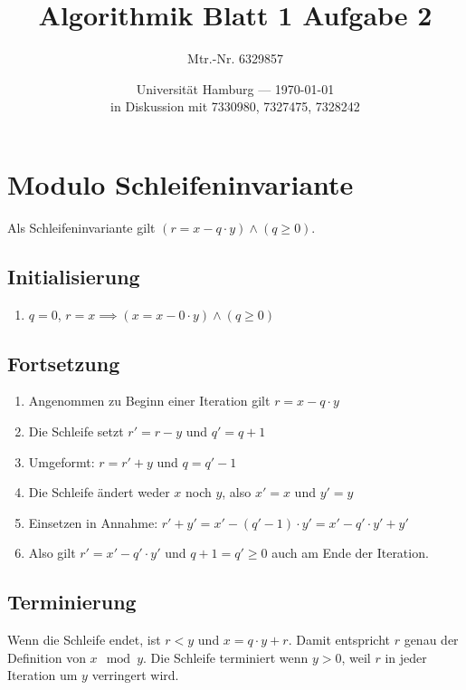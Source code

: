 \documentclass[parskip=half,a4paper]{scrartcl}
\title{Algorithmik Blatt 1 Aufgabe 2}
\author{Mtr.-Nr. 6329857}
\date{Universität Hamburg --- \today \\ in Diskussion mit 7330980, 7327475, 7328242}
\begin{document}
\maketitle

\section*{Modulo Schleifeninvariante}

Als Schleifeninvariante gilt $\left(r = x - q \cdot y\right) \land \left(q \ge 0\right)$.

\subsection*{Initialisierung}

\begin{enumerate}
	\item $q = 0$, $r = x \implies \left(x = x - 0 \cdot y\right) \land \left(q \ge 0\right)$
\end{enumerate}

\subsection*{Fortsetzung}

\begin{enumerate}
	\item Angenommen zu Beginn einer Iteration gilt $r = x - q \cdot y$
	\item Die Schleife setzt $r' = r - y$ und $q' = q + 1$
	\item Umgeformt: $r = r' + y$ und $q = q' - 1$
	\item Die Schleife ändert weder $x$ noch $y$, also $x' = x$ und $y' = y$
	\item Einsetzen in Annahme: $r' + y' = x' - \left(q' - 1\right) \cdot y' = x' - q' \cdot y' + y'$
	\item Also gilt $r' = x' - q' \cdot y'$ und $q + 1 = q' \ge 0$ auch am Ende der Iteration.
\end{enumerate}

\subsection*{Terminierung}

Wenn die Schleife endet, ist $r < y$ und $x = q \cdot y + r$. Damit entspricht $r$ genau der Definition von $x \mod y$. Die Schleife terminiert wenn $y > 0$, weil $r$ in jeder Iteration um $y$ verringert wird.
\end{document}
